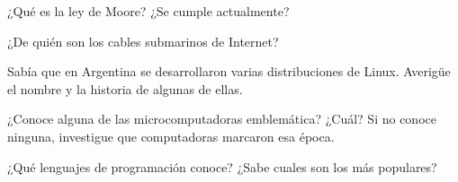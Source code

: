 \begin{exercise}
¿Qué es la ley de Moore? ¿Se cumple actualmente?
\end{exercise}

\begin{exercise}
¿De quién son los cables submarinos de Internet?
\end{exercise}

\begin{exercise}
Sabía que en Argentina se desarrollaron varias distribuciones de Linux. Averigüe
el nombre y la historia de algunas de ellas.
\end{exercise}

\begin{exercise}
¿Conoce alguna de las microcomputadoras emblemática? ¿Cuál? Si no conoce ninguna,
investigue que computadoras marcaron esa época.
\end{exercise}

\begin{exercise}
¿Qué lenguajes de programación conoce?
¿Sabe cuales son los más populares?
\end{exercise}










